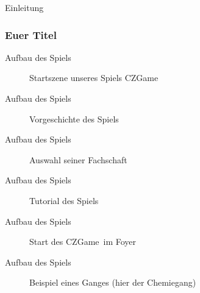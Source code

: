 \begin{frame}
	\begin{center}
		\Huge Einleitung
	\end{center}
\end{frame}

\begin{frame}
	\frametitle{Euer Titel}
\end{frame}

\begin{frame}{Aufbau des Spiels}
	\begin{figure}
		\centering
		\caption[Startscreen]{Startszene unseres Spiels \glqq CZGame\grqq}
		\label{fig:Startscreen}
	\end{figure}
\end{frame}

\begin{frame}{Aufbau des Spiels}
	\begin{figure}
		\centering
		\caption[Vorgeschichte]{Vorgeschichte des Spiels}
		\label{fig:Vorgeschichte}
	\end{figure}
\end{frame}

\begin{frame}{Aufbau des Spiels}
	\begin{figure}
		\centering
		\caption[Fachschaften]{Auswahl seiner Fachschaft}
		\label{fig:Fachschaftauswahl}
	\end{figure}
\end{frame}

\begin{frame}{Aufbau des Spiels}
	\begin{figure}
		\centering
		\caption[Tutorial]{Tutorial des Spiels}
		\label{fig:Tutorial}
	\end{figure}
\end{frame}

\begin{frame}{Aufbau des Spiels}
	\begin{figure}
		\centering
		\caption[Foyer]{Start des \glqq CZGame\grqq \ im Foyer}
		\label{fig:Foyer}
	\end{figure}
\end{frame}

\begin{frame}{Aufbau des Spiels}
	\begin{figure}
		\centering
		\caption[Chemiegang]{Beispiel eines Ganges (hier der Chemiegang)}
		\label{fig:Chemiegang}
	\end{figure}
\end{frame}

